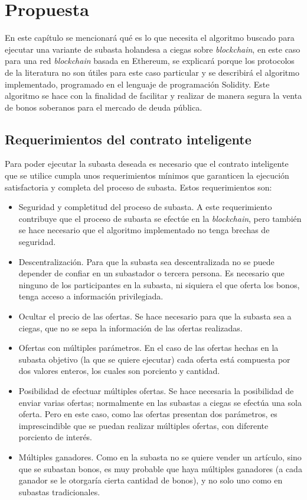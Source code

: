 \chapter{Propuesta}\label{chapter:proposal}

En este capítulo se mencionará qué es lo que necesita el algoritmo buscado para ejecutar una variante de 
subasta holandesa
a ciegas sobre \textit{blockchain}, en este caso para una red \textit{blockchain} basada en Ethereum, se 
explicará porque los protocolos de la literatura no son útiles para este caso particular y se 
describirá el algoritmo implementado, programado en el lenguaje de programación Solidity. Este algoritmo 
se hace con la finalidad de facilitar y realizar de manera segura la venta de bonos soberanos para el 
mercado de deuda pública. 

\section{Requerimientos del contrato inteligente}
  Para poder ejecutar la subasta deseada es necesario que el contrato inteligente que se utilice cumpla
  unos requerimientos mínimos que garanticen la ejecución satisfactoria y completa del proceso de subasta.
  Estos requerimientos son:

  \begin{itemize}
    \item Seguridad y completitud del proceso de subasta. A este requerimiento contribuye que el proceso de
    subasta se efectúe en la \textit{blockchain}, pero también se hace necesario que el algoritmo implementado
    no tenga brechas de seguridad.
    \item Descentralización. Para que la subasta sea descentralizada no se puede depender de confiar en un
    subastador o tercera persona. Es necesario que ninguno de los participantes en la subasta, ni siquiera
    el que oferta los bonos, tenga acceso a información privilegiada.
    \item Ocultar el precio de las ofertas. Se hace necesario para que la subasta sea a ciegas, que
    no se sepa la información de las ofertas realizadas.
    \item Ofertas con múltiples parámetros. En el caso de las ofertas hechas 
    en la subasta objetivo (la que se quiere ejecutar) cada oferta está compuesta por dos valores
    enteros, los cuales son porciento y cantidad. 
    \item Posibilidad de efectuar múltiples ofertas. Se hace necesaria la posibilidad de enviar varias 
    ofertas; normalmente en las subastas a ciegas se efectúa una sola oferta. Pero en este caso, como
    las ofertas presentan dos parámetros, es imprescindible que se puedan realizar múltiples ofertas,
    con diferente porciento de interés.
    \item Múltiples ganadores. Como en la subasta no se quiere vender un artículo, sino que se subastan 
    bonos, es muy probable que haya múltiples ganadores (a cada ganador se le otorgaría
    cierta cantidad de bonos), y no solo uno como en subastas tradicionales.
  \end{itemize}

